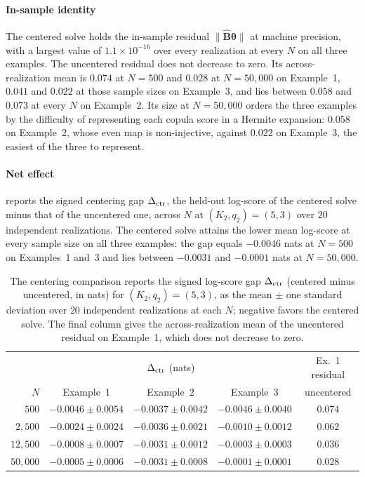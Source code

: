 \documentclass[supplement,review,hidelinks,onefignum,onetabnum]{siamart251216}
\begin{document}
\paragraph{In-sample identity} The centered solve holds the in-sample residual $\|\widehat{\bm B}\bm\theta\|$ at machine precision, with a largest value of $1.1\times10^{-16}$ over every realization at every $N$ on all three examples. The uncentered residual does not decrease to zero. Its across-realization mean is $0.074$ at $N = 500$ and $0.028$ at $N = 50{,}000$ on Example~1, $0.041$ and $0.022$ at those sample sizes on Example~3, and lies between $0.058$ and $0.073$ at every $N$ on Example~2. Its size at $N = 50{,}000$ orders the three examples by the difficulty of representing each copula score in a Hermite expansion: $0.058$ on Example~2, whose even map is non-injective, against $0.022$ on Example~3, the easiest of the three to represent.

\paragraph{Net effect}  reports the signed centering gap $\Delta_{\rm ctr}$, the held-out log-score of the centered solve minus that of the uncentered one, across $N$ at $(K_2, q_2) = (5, 3)$ over $20$ independent realizations. The centered solve attains the lower mean log-score at every sample size on all three examples: the gap equals $-0.0046$ nats at $N = 500$ on Examples~1 and~3 and lies between $-0.0031$ and $-0.0001$ nats at $N = 50{,}000$.

\begin{table}[h]
\centering\small
\setlength{\tabcolsep}{5pt}
\caption{The centering comparison reports the signed log-score gap $\Delta_{\rm ctr}$ (centered minus uncentered, in nats) for $(K_2, q_2) = (5, 3)$, as the mean $\pm$ one standard deviation over $20$ independent realizations at each $N$; negative favors the centered solve. The final column gives the across-realization mean of the uncentered residual on Example~1, which does not decrease to zero.}
\label{tab:sm2-centering}
\begin{tabular}{r|ccc|c}
\toprule
 & \multicolumn{3}{c|}{$\Delta_{\rm ctr}$ (nats)} & Ex.~1 residual \\
$N$ & Example~1 & Example~2 & Example~3 & uncentered \\
\midrule
$500$      & $-0.0046{\pm}0.0054$ & $-0.0037{\pm}0.0042$ & $-0.0046{\pm}0.0040$ & $0.074$ \\
$2{,}500$  & $-0.0024{\pm}0.0024$ & $-0.0036{\pm}0.0021$ & $-0.0010{\pm}0.0012$ & $0.062$ \\
$12{,}500$ & $-0.0008{\pm}0.0007$ & $-0.0031{\pm}0.0012$ & $-0.0003{\pm}0.0003$ & $0.036$ \\
$50{,}000$ & $-0.0005{\pm}0.0006$ & $-0.0031{\pm}0.0008$ & $-0.0001{\pm}0.0001$ & $0.028$ \\
\bottomrule
\end{tabular}
\end{table}
\end{document}

